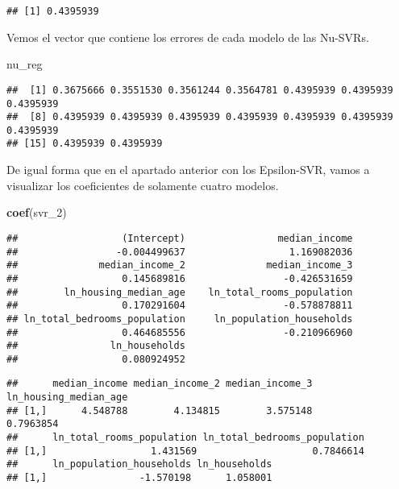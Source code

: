\documentclass[
]{article}
\newenvironment{Shaded}{\begin{snugshade}}{\end{snugshade}}
\newcommand{\DecValTok}[1]{\textcolor[rgb]{0.00,0.00,0.81}{#1}}
\newcommand{\KeywordTok}[1]{\textcolor[rgb]{0.13,0.29,0.53}{\textbf{#1}}}
\newcommand{\NormalTok}[1]{#1}
\newcommand{\OperatorTok}[1]{\textcolor[rgb]{0.81,0.36,0.00}{\textbf{#1}}}
\newcommand{\StringTok}[1]{\textcolor[rgb]{0.31,0.60,0.02}{#1}}
\begin{document}
\begin{verbatim}
## [1] 0.4395939
\end{verbatim}

Vemos el vector que contiene los errores de cada modelo de las Nu-SVRs.

\begin{Shaded}
\begin{Highlighting}[]
\NormalTok{nu_reg}
\end{Highlighting}
\end{Shaded}

\begin{verbatim}
##  [1] 0.3675666 0.3551530 0.3561244 0.3564781 0.4395939 0.4395939 0.4395939
##  [8] 0.4395939 0.4395939 0.4395939 0.4395939 0.4395939 0.4395939 0.4395939
## [15] 0.4395939 0.4395939
\end{verbatim}

De igual forma que en el apartado anterior con los Epsilon-SVR, vamos a
visualizar los coeficientes de solamente cuatro modelos.

\begin{Shaded}
\begin{Highlighting}[]
\KeywordTok{coef}\NormalTok{(svr_}\DecValTok{2}\NormalTok{)}
\end{Highlighting}
\end{Shaded}

\begin{verbatim}
##                  (Intercept)                median_income 
##                 -0.004499637                  1.169082036 
##              median_income_2              median_income_3 
##                  0.145689816                 -0.426531659 
##        ln_housing_median_age    ln_total_rooms_population 
##                  0.170291604                 -0.578878811 
## ln_total_bedrooms_population     ln_population_households 
##                  0.464685556                 -0.210966960 
##                ln_households 
##                  0.080924952
\end{verbatim}

\begin{Shaded}
\end{Shaded}

\begin{verbatim}
##      median_income median_income_2 median_income_3 ln_housing_median_age
## [1,]      4.548788        4.134815        3.575148             0.7963854
##      ln_total_rooms_population ln_total_bedrooms_population
## [1,]                  1.431569                    0.7846614
##      ln_population_households ln_households
## [1,]                -1.570198      1.058001
\end{verbatim}
\end{document}
